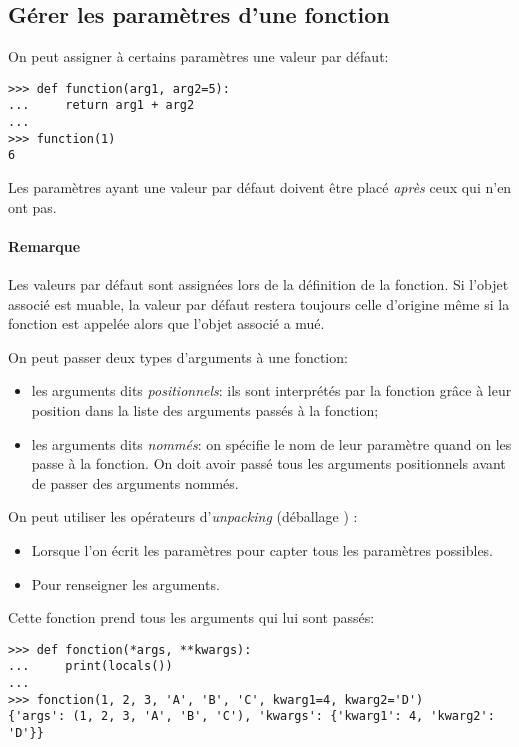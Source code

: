 \subsection{Gérer les paramètres d'une fonction}

On peut assigner à certains paramètres une valeur par défaut:

\begin{verbatim}
>>> def function(arg1, arg2=5):
...     return arg1 + arg2
... 
>>> function(1)
6
\end{verbatim}

Les paramètres ayant une valeur par défaut doivent être placé \emph{après} ceux qui n'en ont pas.

\paragraph*{Remarque} Les valeurs par défaut sont assignées lors de la définition de la fonction. Si l'objet associé est
muable, la valeur par défaut restera toujours celle d'origine même si la fonction est appelée alors que l'objet associé
a mué.\bigskip

On peut passer deux types d'arguments à une fonction:
\begin{itemize}
    \item les arguments dits \emph{positionnels}: ils sont interprétés par la fonction grâce à leur position dans
          la liste des arguments passés à la fonction;
    \item les arguments dits \emph{nommés}: on spécifie le nom de leur paramètre quand on les passe à la fonction.
          On doit avoir passé tous les arguments positionnels avant de passer des arguments nommés.
\end{itemize}

On peut utiliser les opérateurs d'\emph{unpacking} (\og déballage \fg{}) :
\begin{itemize}
    \item Lorsque l'on écrit les paramètres pour capter tous les paramètres possibles.
    \item Pour renseigner les arguments.
\end{itemize}

Cette fonction prend tous les arguments qui lui sont passés:
\begin{verbatim}
>>> def fonction(*args, **kwargs):
...     print(locals())
...
>>> fonction(1, 2, 3, 'A', 'B', 'C', kwarg1=4, kwarg2='D')
{'args': (1, 2, 3, 'A', 'B', 'C'), 'kwargs': {'kwarg1': 4, 'kwarg2': 'D'}}
\end{verbatim}


